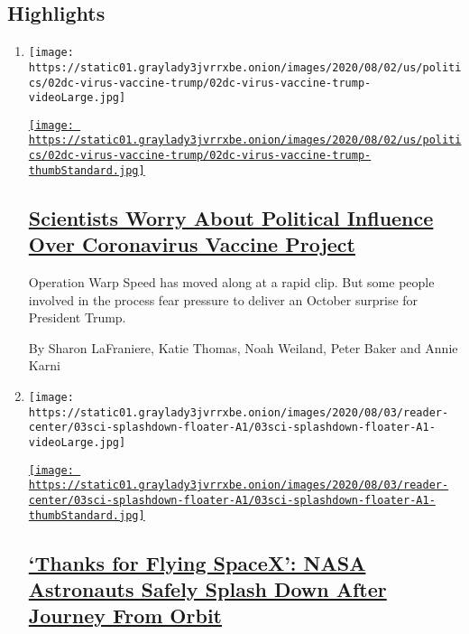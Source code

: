 \hypertarget{highlights}{%
\subsection{Highlights}\label{highlights}}

\begin{enumerate}
\def\labelenumi{\arabic{enumi}.}
\item
  \texttt{[image: https://static01.graylady3jvrrxbe.onion/images/2020/08/02/us/politics/02dc-virus-vaccine-trump/02dc-virus-vaccine-trump-videoLarge.jpg]}

  \href{/2020/08/02/us/politics/coronavirus-vaccine.html}{\texttt{[image: https://static01.graylady3jvrrxbe.onion/images/2020/08/02/us/politics/02dc-virus-vaccine-trump/02dc-virus-vaccine-trump-thumbStandard.jpg]}}

  \hypertarget{scientists-worry-about-political-influence-over-coronavirus-vaccine-project}{%
  \subsection{\texorpdfstring{\href{/2020/08/02/us/politics/coronavirus-vaccine.html}{Scientists
  Worry About Political Influence Over Coronavirus Vaccine
  Project}}{Scientists Worry About Political Influence Over Coronavirus Vaccine Project}}\label{scientists-worry-about-political-influence-over-coronavirus-vaccine-project}}

  Operation Warp Speed has moved along at a rapid clip. But some people
  involved in the process fear pressure to deliver an October surprise
  for President Trump.

  By Sharon LaFraniere, Katie Thomas, Noah Weiland, Peter Baker and
  Annie Karni
\item
  \texttt{[image: https://static01.graylady3jvrrxbe.onion/images/2020/08/03/reader-center/03sci-splashdown-floater-A1/03sci-splashdown-floater-A1-videoLarge.jpg]}

  \href{/2020/08/02/science/spacex-astronauts-splashdown.html}{\texttt{[image: https://static01.graylady3jvrrxbe.onion/images/2020/08/03/reader-center/03sci-splashdown-floater-A1/03sci-splashdown-floater-A1-thumbStandard.jpg]}}

  \hypertarget{thanks-for-flying-spacex-nasa-astronauts-safely-splash-down-after-journey-from-orbit}{%
  \subsection{\texorpdfstring{\href{/2020/08/02/science/spacex-astronauts-splashdown.html}{`Thanks
  for Flying SpaceX': NASA Astronauts Safely Splash Down After Journey
  From
  Orbit}}{`Thanks for Flying SpaceX': NASA Astronauts Safely Splash Down After Journey From Orbit}}\label{thanks-for-flying-spacex-nasa-astronauts-safely-splash-down-after-journey-from-orbit}}


\end{enumerate}
